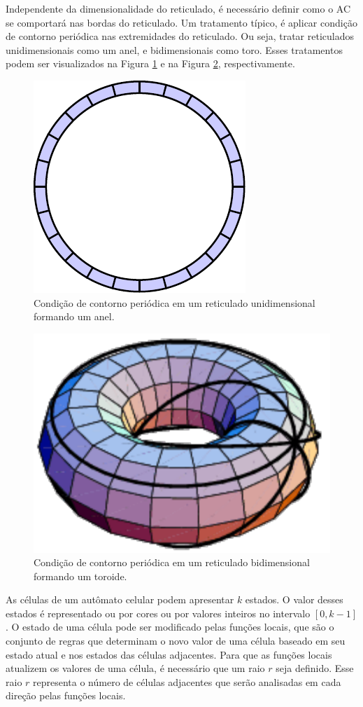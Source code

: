 \documentclass[12pt,a4paper]{article}
\begin{document}
Independente da dimensionalidade do reticulado, é necessário definir como o AC se comportará nas bordas do reticulado. Um tratamento típico, é aplicar condição de contorno periódica nas extremidades do reticulado. Ou seja, tratar reticulados unidimensionais como um anel, e bidimensionais como toro. Esses tratamentos podem ser visualizados na Figura \ref{fig:anel} e na Figura \ref{fig:toro}, respectivamente.  
	\begin{figure}[h!]
	  \centering
	  \includegraphics[width=.3\textwidth]{fig_circularList.pdf}
	  \caption{Condição de contorno periódica em um reticulado unidimensional formando um anel.}
	  \label{fig:anel}
	\end{figure}

	\begin{figure}[h!]
	  \centering
	  \includegraphics[width=.5\textwidth]{fig_toro.pdf}
	  \caption{Condição de contorno periódica em um reticulado bidimensional formando um toroide.}
	  \label{fig:toro}
	\end{figure}

As células de um autômato celular podem apresentar $k$ estados. O valor desses estados é representado ou por cores ou por valores inteiros no intervalo $[0, k-1]$. O estado de uma célula pode ser modificado pelas funções locais, que são o conjunto de regras que determinam o novo valor de uma célula baseado em seu estado atual e nos estados das células adjacentes. Para que as funções locais atualizem os valores de uma célula, é necessário que um raio $r$ seja definido. Esse raio $r$ representa o número de células adjacentes que serão analisadas em cada direção pelas funções locais.
\end{document}
